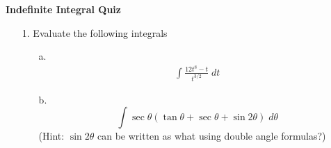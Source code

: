 \documentclass[11pt]{article}
\begin{document}
	
	
	
	
	\centerline{\textbf{\Large{Indefinite Integral Quiz}}}
	
	\vspace{0.2in}
	
	
	\begin{enumerate}
		
		\item[1.]Evaluate the following integrals 
		\begin{enumerate}
			\item[a.] \begin{align*}
				\int \frac{12 t^8 - t}{t^{3/2}} \; dt 
			\end{align*}
			\item[b.] $$ \int \sec \theta (\tan \theta + \sec \theta + \sin 2\theta) \; d\theta$$ (Hint: $\sin 2\theta$ can be written as what using double angle formulas?)
		\end{enumerate}
		
	\end{enumerate}
	
	
	
	
	
	
	
	
\end{document}
